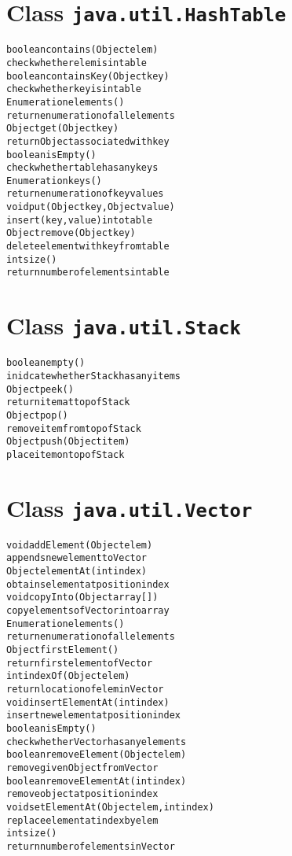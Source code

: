 \documentclass[twocolumn,12pt]{article}
\begin{document}
\section*{Class \texttt{java.util.HashTable}}
\begin{alltt}
boolean contains(Object elem)
   \textrm{check whether} elem \textrm{is in table}
boolean containsKey(Object key)
   \textrm{check whether} key \textrm{is in table}
Enumeration elements()
   \textrm{return enumeration of all elements}
Object get(Object key)
   \textrm{return} Object \textrm{associated with} key
boolean isEmpty()
   \textrm{check whether table has any keys}
Enumeration keys()
   \textrm{return enumeration of key values}
void put(Object key, Object value)
   \textrm{insert} (key,value) \textrm{into table}
Object remove(Object key)
   \textrm{delete element with} key \textrm{from table}
int size()
   \textrm{return number of elements in table}
\end{alltt}

\section*{Class \texttt{java.util.Stack}}
\begin{alltt}
boolean empty()
   \textrm{inidcate whether} Stack \textrm{has any items}
Object peek()
   \textrm{return item at top of} Stack
Object pop()
   \textrm{remove item from top of} Stack
Object push(Object item)
   \textrm{place} item \textrm{on top of} Stack
\end{alltt}

\section*{Class \texttt{java.util.Vector}}
\begin{alltt}
void addElement(Object elem)
   \textrm{appends new element to} Vector
Object elementAt(int index)
   \textrm{obtains element at position} index
void copyInto(Object array[])
   \textrm{copy elements of} Vector \textrm{into} array
Enumeration elements()
   \textrm{return enumeration of all elements}
Object firstElement()
   \textrm{return first element of} Vector
int indexOf(Object elem)
   \textrm{return location of} elem \textrm{in} Vector
void insertElementAt(int index)
   \textrm{insert new element at position} index
boolean isEmpty()
   \textrm{check whether} Vector \textrm{has any elements}
boolean removeElement(Object elem)
   \textrm{remove given} Object \textrm{from} Vector
boolean removeElementAt(int index)
   \textrm{remove object at position} index
void setElementAt(Object elem, int index)
   \textrm{replace element at} index \textrm{by} elem
int size()
   \textrm{return number of elements in} Vector
\end{alltt}
\end{document}
